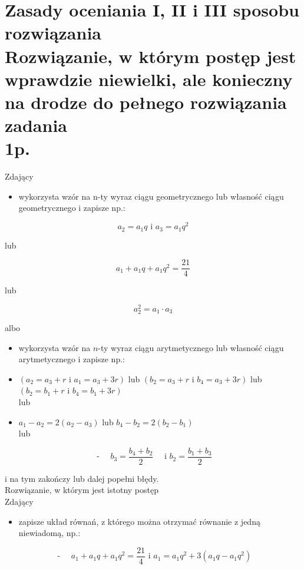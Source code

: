 \documentclass[10pt]{article}
\begin{document}
\section*{Zasady oceniania I, II i III sposobu rozwiązania \\
 Rozwiązanie, w którym postęp jest wprawdzie niewielki, ale konieczny na drodze do pełnego rozwiązania zadania \\
 1p.}
Zdający

\begin{itemize}
  \item wykorzysta wzór na n-ty wyraz ciągu geometrycznego lub własność ciągu geometrycznego i zapisze np.:
\end{itemize}

$$
a_{2}=a_{1} q \text { i } a_{3}=a_{1} q^{2}
$$

lub

$$
a_{1}+a_{1} q+a_{1} q^{2}=\frac{21}{4}
$$

lub

$$
a_{2}^{2}=a_{1} \cdot a_{3}
$$

albo

\begin{itemize}
  \item wykorzysta wzór na $n$-ty wyraz ciągu arytmetycznego lub własność ciągu arytmetycznego i zapisze np.:
  \item $\left(a_{2}=a_{3}+r\right.$ i $\left.a_{1}=a_{3}+3 r\right)$ lub $\left(b_{2}=a_{3}+r\right.$ i $\left.b_{4}=a_{3}+3 r\right)$ lub $\left(b_{2}=b_{1}+r\right.$ i $\left.b_{4}=b_{1}+3 r\right)$\\
lub
  \item $a_{1}-a_{2}=2\left(a_{2}-a_{3}\right)$ lub $b_{4}-b_{2}=2\left(b_{2}-b_{1}\right)$\\
lub
\end{itemize}

$$
\text { - } \quad b_{3}=\frac{b_{4}+b_{2}}{2} \quad \text { i } b_{2}=\frac{b_{1}+b_{3}}{2}
$$

i na tym zakończy lub dalej popełni błędy.\\
Rozwiązanie, w którym jest istotny postęp\\
Zdający

\begin{itemize}
  \item zapisze układ równań, z którego można otrzymać równanie z jedną niewiadomą, np.:
\end{itemize}

$$
\text { - } \quad a_{1}+a_{1} q+a_{1} q^{2}=\frac{21}{4} \text { i } a_{1}=a_{1} q^{2}+3\left(a_{1} q-a_{1} q^{2}\right)
$$
\end{document}
